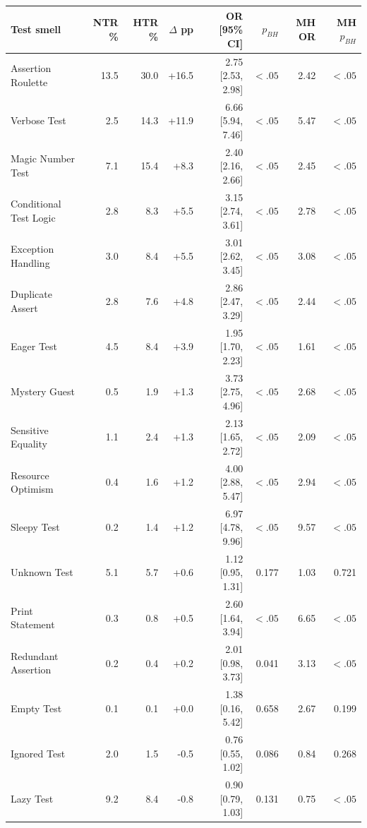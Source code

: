 \begin{tabular}{lrrrrrrr}
\toprule
\textbf{Test smell} & \textbf{NTR \%} & \textbf{HTR \%} & \textbf{$\Delta$ pp} &
\textbf{OR [95\% CI]} & \textbf{$p_{BH}$} & \textbf{MH OR} & \textbf{MH $p_{BH}$} \\
\midrule
Assertion Roulette & 13.5 & 30.0 & +16.5 & 2.75 [2.53, 2.98] & $<.05$ & 2.42 & $<.05$ \\
Verbose Test & 2.5 & 14.3 & +11.9 & 6.66 [5.94, 7.46] & $<.05$ & 5.47 & $<.05$ \\
Magic Number Test & 7.1 & 15.4 & +8.3 & 2.40 [2.16, 2.66] & $<.05$ & 2.45 & $<.05$ \\
Conditional Test Logic & 2.8 & 8.3 & +5.5 & 3.15 [2.74, 3.61] & $<.05$ & 2.78 & $<.05$ \\
Exception Handling & 3.0 & 8.4 & +5.5 & 3.01 [2.62, 3.45] & $<.05$ & 3.08 & $<.05$ \\
Duplicate Assert & 2.8 & 7.6 & +4.8 & 2.86 [2.47, 3.29] & $<.05$ & 2.44 & $<.05$ \\
Eager Test & 4.5 & 8.4 & +3.9 & 1.95 [1.70, 2.23] & $<.05$ & 1.61 & $<.05$ \\
Mystery Guest & 0.5 & 1.9 & +1.3 & 3.73 [2.75, 4.96] & $<.05$ & 2.68 & $<.05$ \\
Sensitive Equality & 1.1 & 2.4 & +1.3 & 2.13 [1.65, 2.72] & $<.05$ & 2.09 & $<.05$ \\
Resource Optimism & 0.4 & 1.6 & +1.2 & 4.00 [2.88, 5.47] & $<.05$ & 2.94 & $<.05$ \\
Sleepy Test & 0.2 & 1.4 & +1.2 & 6.97 [4.78, 9.96] & $<.05$ & 9.57 & $<.05$ \\
Unknown Test & 5.1 & 5.7 & +0.6 & 1.12 [0.95, 1.31] & 0.177 & 1.03 & 0.721 \\
Print Statement & 0.3 & 0.8 & +0.5 & 2.60 [1.64, 3.94] & $<.05$ & 6.65 & $<.05$ \\
Redundant Assertion & 0.2 & 0.4 & +0.2 & 2.01 [0.98, 3.73] & 0.041 & 3.13 & $<.05$ \\
Empty Test & 0.1 & 0.1 & +0.0 & 1.38 [0.16, 5.42] & 0.658 & 2.67 & 0.199 \\
Ignored Test & 2.0 & 1.5 & -0.5 & 0.76 [0.55, 1.02] & 0.086 & 0.84 & 0.268 \\
Lazy Test & 9.2 & 8.4 & -0.8 & 0.90 [0.79, 1.03] & 0.131 & 0.75 & $<.05$ \\
\bottomrule
\end{tabular}
